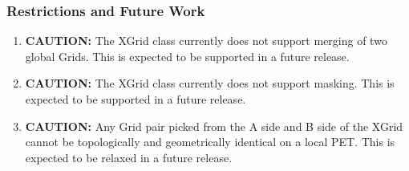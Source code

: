 
\subsubsection{Restrictions and Future Work}

\begin{enumerate}
\label{XGrid:rest}

\item {\bf CAUTION:} The XGrid class currently does not support merging of two global Grids. This is expected to be supported in a future release.
\item {\bf CAUTION:} The XGrid class currently does not support masking. This is expected to be supported in a future release.
\item {\bf CAUTION:} Any Grid pair picked from the A side and B side of the XGrid cannot be topologically and geometrically identical on a local PET. This is expected to
be relaxed in a future release. 

\end{enumerate}



